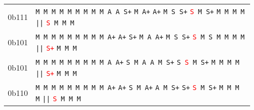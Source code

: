 \begin{table}[]
{{\begin{tabular}{r|l}
0b1{\color{red}1}1 & \texttt{M  M  M  M  M  M  M  M  M A }\space \texttt{A }\space \texttt{S+}       \texttt{M A+}       \texttt{A+}       \texttt{M S }\space \texttt{S+}       \texttt{\textcolor{red}{S }}\space \texttt{M S+}       \texttt{M  M  M  M} \texttt{||} \texttt{\textcolor{red}{S }}\space \texttt{M  M  M} \\
0b1{\color{red}0}1 & \texttt{M  M  M  M  M  M  M  M  M A+}       \texttt{A+}       \texttt{S+}       \texttt{M A }\space \texttt{A+}       \texttt{M S }\space \texttt{S+}       \texttt{\textcolor{red}{S }}\space \texttt{M S }\space \texttt{M  M  M  M} \texttt{||} \texttt{\textcolor{red}{S+}}       \texttt{M  M  M} \\
0b1{\color{red}0}1 & \texttt{M  M  M  M  M  M  M  M  M A }\space \texttt{A+}       \texttt{S }\space \texttt{M A }\space \texttt{A }\space \texttt{M S+}       \texttt{S }\space \texttt{\textcolor{red}{S }}\space \texttt{M S+}       \texttt{M  M  M  M} \texttt{||} \texttt{\textcolor{red}{S+}}       \texttt{M  M  M} \\
0b1{\color{red}1}0 & \texttt{M  M  M  M  M  M  M  M  M A+}       \texttt{A+}       \texttt{S }\space \texttt{M A+}       \texttt{A }\space \texttt{M S+}       \texttt{S+}       \texttt{\textcolor{red}{S }}\space \texttt{M S+}       \texttt{M  M  M  M} \texttt{||} \texttt{\textcolor{red}{S }}\space \texttt{M  M  M} \\
\end{tabular}
}
}
\end{table}